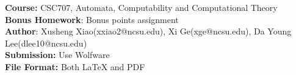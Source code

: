 \documentclass[article, 10pt,onecolumn]{article}
\begin{document}
\begin{flushleft}
\textbf{Course:} CSC707, Automata, Computability and Computational Theory\\
\textbf{Bonus Homework}: Bonus points assignment\\
\textbf{Author}: Xusheng Xiao(\small{xxiao2@ncsu.edu}), Xi Ge(\small{xge@ncsu.edu}), Da Young Lee(\small{dlee10@ncsu.edu})\\
\textbf{Submission:} Use Wolfware\\
\textbf{File Format:} Both LaTeX and PDF\\
\end{flushleft}

\begin{center}
\\
\end{center}
\noindent{\hrulefill}
\end{document}

